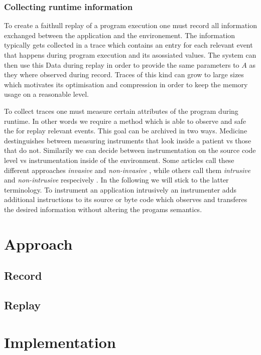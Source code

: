 \documentclass[11pt,a4paper]{book}
\begin{document}
\subsection{Collecting runtime information}

To create a faithull replay of a program execution one must record all information
exchanged between the application and the environement. The information typically
gets collected in a trace which contains an entry for each relevant event that
happens during program execution and its
asossiated values. The system can then use this Data during replay in order to 
provide the same parameters to $A$ as they where observed during record. Traces of
this kind can grow to large sizes which motivates its optimisation and compression
in order to keep the memory usage on a reasonable level.

To collect traces one must measure certain attributes of the program during runtime.
In other words we require a method which is able to observe and safe the for replay
relevant events. This goal can be archived in two ways. Medicine destinguishes
between measuring instruments that look inside a patient vs those that do not.
Similarily we can decide between instrumentation on the source code level vs
instrumentation inside of the environment. Some articles call these different
approaches \textit{invasive} and \textit{non-invasive} \cite{janes2023open}, while
others call them \textit{intrusive} and \textit{non-intrusive} respecively \cite{Flexible Non-intrusive Dynamic Instrumentation for WebAssembly}.
In the following we will stick to the latter terminology. To instrument an application 
intrusively an instrumenter adds additional instructions to its source or byte code
which observes and transferes the desired information without altering the progams
semantics. %


\chapter{Approach}
\section{Record}
\section{Replay}

\chapter{Implementation}
\end{document}
